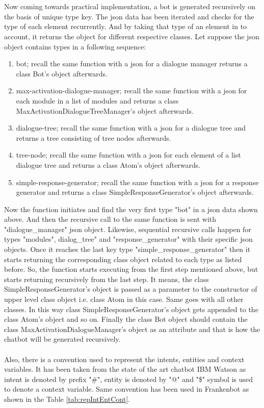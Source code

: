\\~\\
Now coming towards practical implementation, a bot is generated recursively on the basis of unique type key. The json data has been iterated and checks for the type of each element recurrently. And by taking that type of an element in to account, it returns the object for different respective classes. Let suppose the json object contains types in a following sequence:
\begin{enumerate}
    \item bot; recall the same function with a json for a dialogue manager returns a class Bot's object afterwards.
    \item max-activation-dialogue-manager; recall the same function with a json for each module in a list of modules and returns a class MaxActivationDialogueTreeManager's object afterwards.
    \item dialogue-tree; recall the same function with a json for a dialogue tree and returns a tree consisting of tree nodes afterwards.
     \item tree-node; recall the same function with a json for each element of a list dialogue tree and returns a class Atom's object afterwards.
     \item simple-response-generator; recall the same function with a json for a response generator and returns a class SimpleResponseGenerator's object afterwards.
\end{enumerate} 
Now the function initiates and find the very first type "bot" in a json data shown above. And then the recursive call to the same function is sent with "dialogue\_manager" json object. Likewise, sequential recursive calls happen for types "modules", dialog\_tree" and "response\_generator" with their specific json objects. Once it reaches the last key type "simple\_response\_generator" then it starts returning the corresponding class object related to each type as listed before. So, the function starts executing from the first step mentioned above, but starts returning recursively from the last step. It means, the class SimpleResponseGenerator's object is passed as a parameter to the constructor of upper level class object i.e. class Atom in this case. Same goes with all other classes. In this way class SimpleResponseGenerator's object gets appended to the class Atom's object and so on. Finally the class Bot object should contain the class MaxActivationDialogueManager's object as an attribute and that is how the chatbot will be generated recursively.
\\~\\
Also, there is a convention used to represent the intents, entities and context variables. It has been taken from the state of the art chatbot IBM Watson as intent is denoted by prefix "\#", entity is denoted by "@" and "\$" symbol is used to denote a context variable. Same convention has been used in Frankenbot as shown in the Table \ref{tab:repIntEntCont}.

